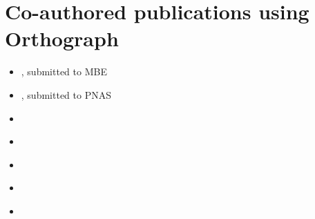 \chapter{Co-authored publications using Orthograph}
\label{app:papers-using-orthograph}

\begin{itemize}
	\item \citet{Gillung2018}, submitted to MBE
	\item \citet{Johnson2018}, submitted to PNAS
	\item \citet{Peters2017}
	\item \citet{Dowling2017}
	\item \citet{Bank2017}
	\item \citet{Pauli2016}
	\item \citet{Mayer2016}
\end{itemize}




%

%

%

%

